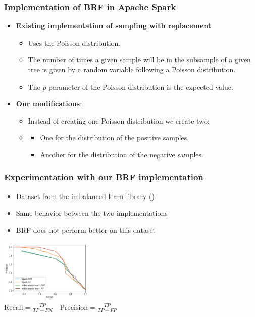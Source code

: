 \documentclass[slidestop,compress,red,mathserif]{beamer}
\newcommand{\colorcite}[1]{\colorlet{saved}{.}\color{sangria}\cite{#1}\color{saved}}
\begin{document}
\begin{frame}
\frametitle{Implementation of BRF in Apache Spark}
\begin{itemize}
  \item[] \textbf{Existing implementation of sampling with replacement}
    \begin{itemize}
    	\item Uses the Poisson distribution.
    	\item The number of times a given sample will be in the subsample of a given tree is given by a random variable following a Poisson distribution.
      \item The $p$ parameter of the Poisson distribution is the expected value.
    \end{itemize}
  \item[] \textbf{Our modifications}:
    \begin{itemize}
      \item Instead of creating one Poisson distribution we create two:
    	\item[]
      \begin{itemize}
      	\item One for the distribution of the positive samples.
        \item Another for the distribution of the negative samples.
      \end{itemize}
    \end{itemize}
\end{itemize}
\end{frame}

\begin{frame}
\frametitle{Experimentation with our BRF implementation}
\begin{itemize}
  \item Dataset from the imbalanced-learn library (\colorcite{Woods1993})
  \item Same behavior between the two implementations
  \item BRF does not perform better on this dataset
\end{itemize}

\centering
\includegraphics[height=3.0cm, keepaspectratio]{Figures/test_brf_pr.png}\\
$\mathrm{Recall} = \frac{TP}{TP+FN} \quad  \mathrm{Precision} = \frac{TP}{TP+FP}$

\end{frame}
\end{document}
